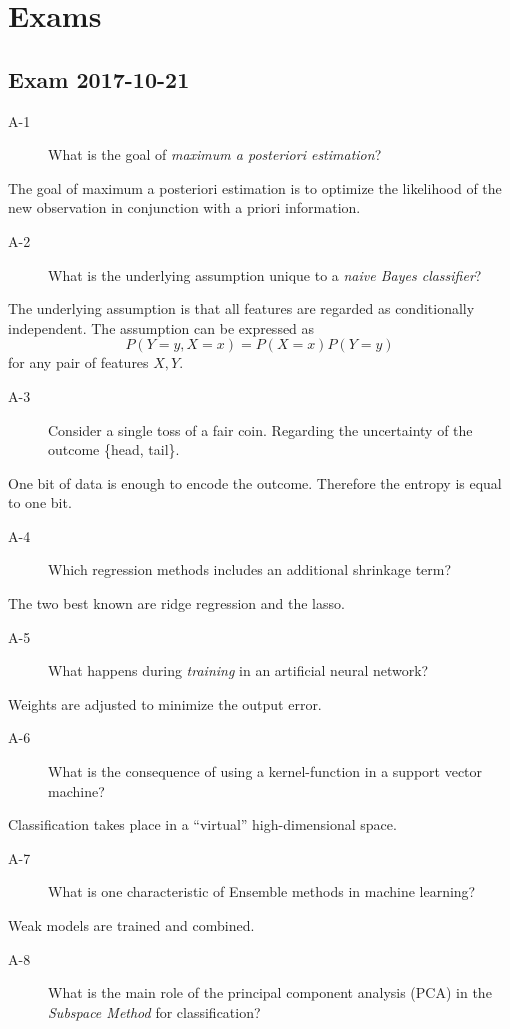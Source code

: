 \documentclass[10pt,a4paper]{article}
\newenvironment{prob}[1]%
   {%
    \begin{description}\item[#1]}%
   {\end{description}}
\begin{document}
\section{Exams}

\subsection{Exam 2017-10-21}

\begin{prob}{A-1}
  What is the goal of \textit{maximum a posteriori estimation}?
\end{prob}
The goal of maximum a posteriori estimation is to optimize the
likelihood of the new observation in conjunction with a priori
information.

\begin{prob}{A-2}
  What is the underlying assumption unique to a \textit{naive Bayes
    classifier}?
\end{prob}
The underlying assumption is that all features are regarded as
conditionally independent. The assumption can be expressed as
\begin{equation}
  P(Y = y, X = x) = P(X = x)P(Y = y)
\end{equation}
for any pair of features $X, Y$.
\begin{prob}{A-3}
  Consider a single toss of a fair coin. Regarding the uncertainty of
  the outcome \{head, tail\}.
\end{prob}
One bit of data is enough to encode the outcome. Therefore the entropy
is equal to one bit.
\begin{prob}{A-4}
  Which regression methods includes an additional shrinkage term?
\end{prob}
The two best known are ridge regression and the lasso.
\begin{prob}{A-5}
  What happens during \textit{training} in an artificial neural
  network?
\end{prob}
Weights are adjusted to minimize the output error.
\begin{prob}{A-6}
  What is the consequence of using a kernel-function in a support
  vector machine?
\end{prob}
Classification takes place in a ``virtual'' high-dimensional space.
\begin{prob}{A-7}
  What is one characteristic of Ensemble methods in machine learning?
\end{prob}
Weak models are trained and combined.
\begin{prob}{A-8}
  What is the main role of the principal component analysis (PCA) in
  the \textit{Subspace Method} for classification?
\end{prob}
\end{document}
